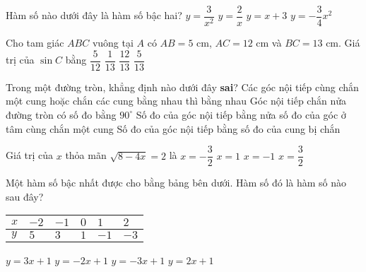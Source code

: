\begin{ex}%
Hàm số nào dưới đây là hàm số bậc hai?
\choice
{$y=\dfrac{3}{x^2}$}
{$y=\dfrac{2}{x}$}
{$y=x+3$}
{\True $y=-\dfrac{3}{4}x^2$}
\end{ex}
\begin{ex}%
Cho tam giác $ABC$ vuông tại $A$ có $AB=5$ cm, $AC=12$ cm và $BC=13$ cm. Giá trị của $\sin C$ bằng
\choice
{$\dfrac{5}{12}$}
{$\dfrac{1}{13}$}
{$\dfrac{12}{13}$}
{\True $\dfrac{5}{13}$}
\end{ex}
\begin{ex}%
Trong một đường tròn, khẳng định nào dưới đây \textbf{sai}?
\choice
{Các góc nội tiếp cùng chắn một cung hoặc chắn các cung bằng nhau thì bằng nhau}
{Góc nội tiếp chắn nửa đường tròn có số đo bằng $90^\circ$}
{Số đo của góc nội tiếp bằng nửa số đo của góc ở tâm cùng chắn một cung}
{\True Số đo của góc nội tiếp bằng số đo của cung bị chắn}
\end{ex}
\begin{ex}%
Giá trị của $x$ thỏa mãn $\sqrt{8-4x}=2$ là 
\choice
{$x=-\dfrac{3}{2}$}
{\True $x=1$}
{$x=-1$}
{$x=\dfrac{3}{2}$}
\end{ex}
\begin{ex}%
Một hàm số bậc nhất được cho bằng bảng bên dưới. Hàm số đó là hàm số nào sau đây?
\begin{center}
\begin{tabular}{|>{\centering\arraybackslash}p{1cm}|>{\centering\arraybackslash}p{1cm}|>{\centering\arraybackslash}p{1cm}|>{\centering\arraybackslash}p{1cm}|>{\centering\arraybackslash}p{1cm}|>{\centering\arraybackslash}p{1cm}|}
\hline 
$x$ & $-2$ & $-1$ & $0$ & $1$ & $2$ \\ 
\hline 
$y$ & $5$ & $3$ & $1$ & $-1$ & $-3$ \\ 
\hline 
\end{tabular} 
\end{center}
\choice
{$y=3x+1$}
{\True $y=-2x+1$}
{$y=-3x+1$}
{$y=2x+1$}
\end{ex}

